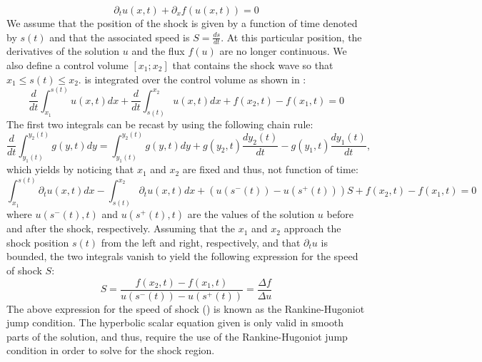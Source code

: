 %
\begin{equation}\label{eq:rh_sct1b}
\partial_t u(x,t) + \partial_x f(u(x,t)) = 0
\end{equation}
%
We assume that the position of the shock is given by a function of time denoted by $s(t)$ and that the associated speed is $S = \frac{ds}{dt}$. At this particular position, the derivatives of the solution $u$ and the flux $f(u)$ are no longer continuous. We also define a control volume $\left[ x_1; x_2 \right]$ that contains the shock wave so that $x_1 \leq s(t) \leq x_2$.  is integrated over the control volume as shown in :
%
\begin{equation}\label{eq:rh2_sct1b}
\frac{d}{dt} \int_{x_1}^{s(t)} u(x,t) dx + \frac{d}{dt} \int_{s(t)}^{x_2} u(x,t) dx + f(x_2,t) - f(x_1,t) = 0
\end{equation}
% 
The first two integrals can be recast by using the following chain rule:
%
\begin{equation}\label{eq:rh3_sct1b}
\frac{d}{dt} \int_{y_1(t)}^{y_2(t)} g(y,t) dy =  \int_{y_1(t)}^{y_2(t)} g(y,t) dy + g(y_2,t) \frac{d y_2(t)}{dt} - g(y_1,t) \frac{d y_1(t)}{dt},
\end{equation}
% 
which yields by noticing that $x_1$ and $x_2$ are fixed and thus, not function of time:
%
\begin{equation}\label{eq:rh4_sct1b}
\int_{x_1}^{s(t)} \partial_t u(x,t) dx - \int_{s(t)}^{x_2} \partial_t u(x,t) dx + \left( u(s^-(t)) - u(s^+(t)) \right) S + f(x_2,t) - f(x_1,t) = 0
\end{equation}
%
where $u(s^-(t),t)$ and $u(s^+(t),t)$ are the values of the solution $u$ before and after the shock, respectively. Assuming that the $x_1$ and $x_2$ approach the shock position $s(t)$ from the left and right, respectively, and that $\partial_t u$ is bounded, the two integrals vanish to yield the following expression for the speed of shock $S$:
%
\begin{equation}\label{eq:rh5_sct1b}
S = \frac{f(x_2,t) - f(x_1,t)}{u(s^-(t)) - u(s^+(t))} = \frac{\Delta f}{\Delta u}
\end{equation}
%
The above expression for the speed of shock () is known as the Rankine-Hugoniot jump condition. The hyperbolic scalar equation given  is only valid in smooth parts of the solution, and thus, require the use of the Rankine-Hugoniot jump condition in order to solve for the shock region.   
